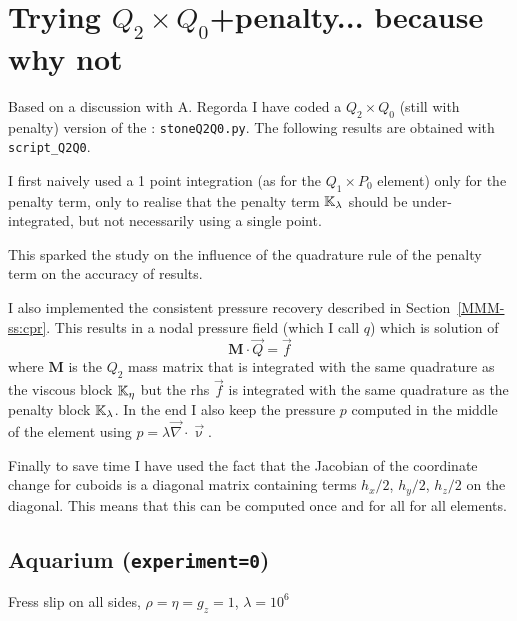 \newpage
\section*{Trying $Q_2\times Q_0$+penalty... because why not}

Based on a discussion with A. Regorda I have coded a $Q_2\times Q_0$
(still with penalty) version of the \stone: {\tt stoneQ2Q0.py}.
The following results are obtained with {\tt script\_Q2Q0}.

I first naively used a 1 point integration (as for the 
$Q_1 \times P_0$ element) only for the 
penalty term, only to realise that the penalty term ${\mathbb{K}}_\lambda$ should be 
under-integrated, but not necessarily using a single point. 

This sparked the study on the influence of the quadrature rule 
of the penalty term on the accuracy of results.

I also implemented the consistent pressure recovery described 
in Section~\ref{MMM-ss:cpr}.
This results in a nodal pressure field (which I call $q$) which is 
solution of 
\[
{\bm M} \cdot \vec{Q} = \vec{f}
\]
where ${\bm M}$ is the $Q_2$ mass matrix that 
is integrated with the same quadrature as the viscous block ${\mathbb{K}}_\eta$
but the rhs $\vec{f}$ is integrated with the same quadrature as 
the penalty block ${\mathbb{K}}_\lambda$.
In the end I also keep the pressure $p$ computed in the middle of the element
using $p= \lambda \vec\nabla\cdot \vec\upnu$.

Finally to save time I have used the fact that the Jacobian of the 
coordinate change for cuboids is a diagonal matrix containing terms $h_x/2$,
$h_y/2$, $h_z/2$ on the diagonal. This means that this can be computed once
and for all for all elements. 

\subsection*{Aquarium ({\tt experiment=0})}

Fress slip on all sides, $\rho=\eta=g_z=1$, $\lambda=10^6$

